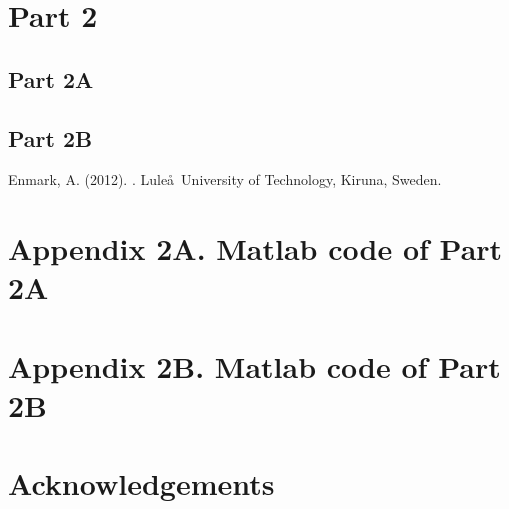 \documentclass{article}
\begin{document}
\section{Part 2}


\subsection{Part 2A}


\subsection{Part 2B}


\begin{thebibliography}{9}

Enmark, A.  (2012).
.
\newblock Lule\aa \ University of Technology, Kiruna, Sweden.

\end{thebibliography}


\section{Appendix 2A. Matlab code of Part 2A}


\section{Appendix 2B. Matlab code of Part 2B}


\section{Acknowledgements}
\end{document}
